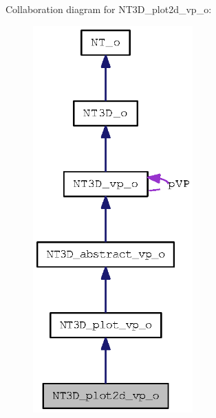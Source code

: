 Collaboration diagram for NT3D\_\-plot2d\_\-vp\_\-o:
\nopagebreak
\begin{figure}[H]
\begin{center}
\leavevmode
\includegraphics[width=174pt]{class_n_t3_d__plot2d__vp__o__coll__graph}
\end{center}
\end{figure}
